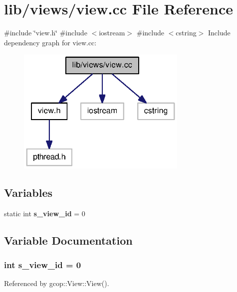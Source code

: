 \section{lib/views/view.cc \-File \-Reference}
\label{view_8cc}
{\ttfamily \#include \char`\"{}view.\-h\char`\"{}}\*
{\ttfamily \#include $<$iostream$>$}\*
{\ttfamily \#include $<$cstring$>$}\*
\-Include dependency graph for view.\-cc\-:\nopagebreak
\begin{figure}[H]
\begin{center}
\leavevmode
\includegraphics[width=230pt]{view_8cc__incl}
\end{center}
\end{figure}
\subsection*{\-Variables}
\begin{DoxyCompactItemize}
\item 
static int {\bf s\-\_\-view\-\_\-id} = 0
\end{DoxyCompactItemize}


\subsection{\-Variable \-Documentation}
\subsubsection[{s\-\_\-view\-\_\-id}]{\setlength{\rightskip}{0pt plus 5cm}int {\bf s\-\_\-view\-\_\-id} = 0\hspace{0.3cm}{\ttfamily  [static]}}\label{view_8cc_adac42b0fabfda1a93611330ad368fff0}


\-Referenced by gcop\-::\-View\-::\-View().

